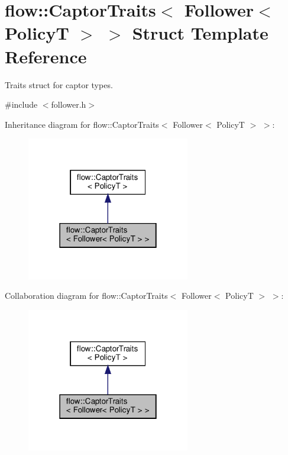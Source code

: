 \hypertarget{structflow_1_1_captor_traits_3_01_follower_3_01_policy_t_01_4_01_4}{}\section{flow\+:\+:Captor\+Traits$<$ Follower$<$ PolicyT $>$ $>$ Struct Template Reference}
\label{structflow_1_1_captor_traits_3_01_follower_3_01_policy_t_01_4_01_4}


Traits struct for captor types.  




{\ttfamily \#include $<$follower.\+h$>$}



Inheritance diagram for flow\+:\+:Captor\+Traits$<$ Follower$<$ PolicyT $>$ $>$\+:\nopagebreak
\begin{figure}[H]
\begin{center}
\leavevmode
\includegraphics[width=202pt]{structflow_1_1_captor_traits_3_01_follower_3_01_policy_t_01_4_01_4__inherit__graph}
\end{center}
\end{figure}


Collaboration diagram for flow\+:\+:Captor\+Traits$<$ Follower$<$ PolicyT $>$ $>$\+:\nopagebreak
\begin{figure}[H]
\begin{center}
\leavevmode
\includegraphics[width=202pt]{structflow_1_1_captor_traits_3_01_follower_3_01_policy_t_01_4_01_4__coll__graph}
\end{center}
\end{figure}


